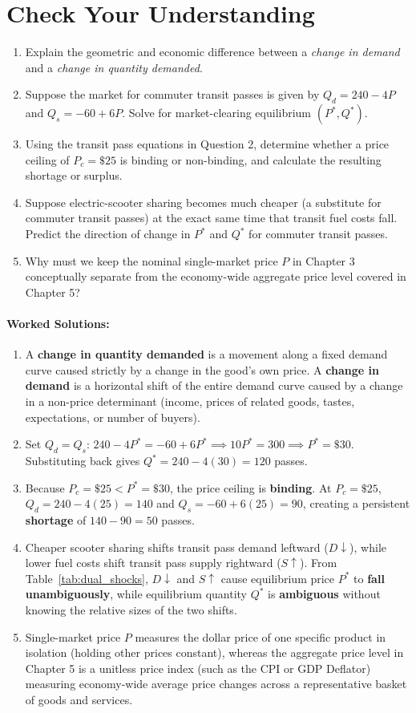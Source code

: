 \documentclass[11pt,letterpaper]{article}
\begin{document}
\section{Check Your Understanding}
\begin{enumerate}
  \item Explain the geometric and economic difference between a \emph{change in demand} and a \emph{change in quantity demanded}.
  \item Suppose the market for commuter transit passes is given by $Q_d = 240 - 4P$ and $Q_s = -60 + 6P$. Solve for market-clearing equilibrium $(P^*, Q^*)$.
  \item Using the transit pass equations in Question 2, determine whether a price ceiling of $P_c = \$25$ is binding or non-binding, and calculate the resulting shortage or surplus.
  \item Suppose electric-scooter sharing becomes much cheaper (a substitute for commuter transit passes) at the exact same time that transit fuel costs fall. Predict the direction of change in $P^*$ and $Q^*$ for commuter transit passes.
  \item Why must we keep the nominal single-market price $P$ in Chapter 3 conceptually separate from the economy-wide aggregate price level covered in Chapter 5?
\end{enumerate}

\paragraph{Worked Solutions:}
\begin{enumerate}
  \item A \textbf{change in quantity demanded} is a movement along a fixed demand curve caused strictly by a change in the good's own price. A \textbf{change in demand} is a horizontal shift of the entire demand curve caused by a change in a non-price determinant (income, prices of related goods, tastes, expectations, or number of buyers).
  \item Set $Q_d = Q_s$: $240 - 4P^* = -60 + 6P^* \implies 10P^* = 300 \implies P^* = \$30$. Substituting back gives $Q^* = 240 - 4(30) = 120$ passes.
  \item Because $P_c = \$25 < P^* = \$30$, the price ceiling is \textbf{binding}. At $P_c = \$25$, $Q_d = 240 - 4(25) = 140$ and $Q_s = -60 + 6(25) = 90$, creating a persistent \textbf{shortage} of $140 - 90 = 50$ passes.
  \item Cheaper scooter sharing shifts transit pass demand leftward ($D \downarrow$), while lower fuel costs shift transit pass supply rightward ($S \uparrow$). From Table~\ref{tab:dual_shocks}, $D \downarrow$ and $S \uparrow$ cause equilibrium price $P^*$ to \textbf{fall unambiguously}, while equilibrium quantity $Q^*$ is \textbf{ambiguous} without knowing the relative sizes of the two shifts.
  \item Single-market price $P$ measures the dollar price of one specific product in isolation (holding other prices constant), whereas the aggregate price level in Chapter 5 is a unitless price index (such as the CPI or GDP Deflator) measuring economy-wide average price changes across a representative basket of goods and services.
\end{enumerate}
\end{document}
